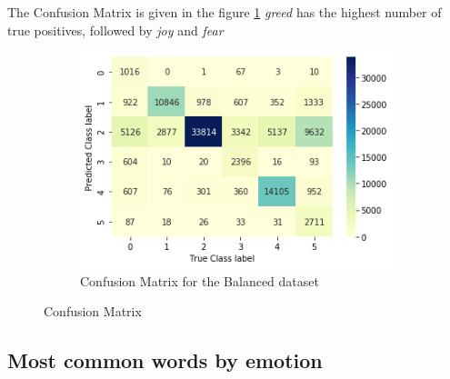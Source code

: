 \documentclass[a4paper, 12pt]{article}
\begin{document}
The Confusion Matrix is given in the figure \ref{fig:con1}
\textit{greed} has the highest number of true positives, followed by \textit{joy} and \textit{fear}
 
\begin{figure}[H]
    \centering
    \begin{subfigure}[a]{0.48\textwidth}
        \includegraphics[width=\textwidth]{res/con1.png}
        \caption{Confusion Matrix for the Balanced dataset}
    \end{subfigure}
		\caption{Confusion Matrix}
		\label{fig:con1}
\end{figure}


\subsection{Most common words by emotion}
\label{sec:wordclouds1}
\end{document}
